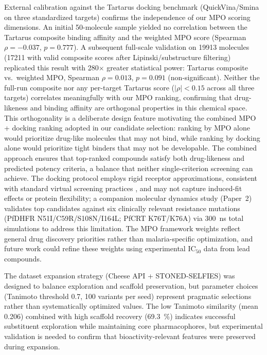 \documentclass[journal=jcisd8,manuscript=article]{achemso}
\begin{document}
External calibration against the Tartarus docking benchmark \citep{nigam2023tartarus} (QuickVina/Smina on three standardized targets) confirms the independence of our MPO scoring dimensions. An initial 50-molecule sample yielded no correlation between the Tartarus composite binding affinity and the weighted MPO score (Spearman $\rho = \num{-0.037}$, $p = \num{0.777}$). A subsequent full-scale validation on \num{19913} molecules (\num{17211} with valid composite scores after Lipinski/substructure filtering) replicated this result with \num{280}$\times$ greater statistical power: Tartarus composite vs.\ weighted MPO, Spearman $\rho = \num{0.013}$, $p = \num{0.091}$ (non-significant). Neither the full-run composite nor any per-target Tartarus score ($|\rho| < \num{0.15}$ across all three targets) correlates meaningfully with our MPO ranking, confirming that drug-likeness and binding affinity are orthogonal properties in this chemical space. This orthogonality is a deliberate design feature motivating the combined MPO + docking ranking adopted in our candidate selection: ranking by MPO alone would prioritize drug-like molecules that may not bind, while ranking by docking alone would prioritize tight binders that may not be developable. The combined approach ensures that top-ranked compounds satisfy both drug-likeness and predicted potency criteria, a balance that neither single-criterion screening can achieve. The docking protocol employs rigid receptor approximations, consistent with standard virtual screening practices \citep{kitchen2004, shoichet2004}, and may not capture induced-fit effects or protein flexibility; a companion molecular dynamics study (Paper~2) validates top candidates against six clinically relevant resistance mutations (PfDHFR N51I/C59R/S108N/I164L; PfCRT K76T/K76A) via 300~ns total simulations to address this limitation. The MPO framework weights reflect general drug discovery priorities rather than malaria-specific optimization, and future work could refine these weights using experimental IC$_{50}$ data from lead compounds.

The dataset expansion strategy (Cheese API + STONED-SELFIES) was designed to balance exploration and scaffold preservation, but parameter choices (Tanimoto threshold \num{0.7}, \num{100} variants per seed) represent pragmatic selections rather than systematically optimized values. The low Tanimoto similarity (mean \num{0.206}) combined with high scaffold recovery (\qty{69.3}{\percent}) indicates successful substituent exploration while maintaining core pharmacophores, but experimental validation is needed to confirm that bioactivity-relevant features were preserved during expansion.
\end{document}
